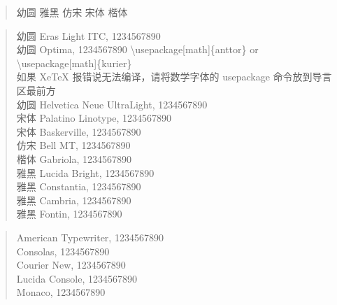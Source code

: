 \documentclass[12pt,a4paper]{article}
\begin{document}
\begin{Large}

\begin{verse}
{\YouYuan 幼圆}
{\YaHei 雅黑}
{\FangSong 仿宋}
{\SimSun 宋体}
{\KaiTi 楷体}
\end{verse}


\begin{verse}
{\YouYuan 幼圆} {\Eras Eras Light ITC, 1234567890}\\
{\YouYuan 幼圆} {\Optima Optima, 1234567890 \tiny{\Monaco \textbackslash{}usepackage[math]\{anttor\}
    or \textbackslash{}usepackage[math]\{kurier\}}}\\
    
    {\tiny\YouYuan 如果 {\Optima XeTeX{}} 报错说无法编译，请将数学字体的 {\Optima usepackage} 命令放到导言区最前方}\\
{\YouYuan 幼圆} {\HelveticaNeueUL Helvetica Neue UltraLight, 1234567890}\\
{\SimSun 宋体} {\Palatino Palatino Linotype, 1234567890}\\
{\SimSun 宋体} {\Baskerville Baskerville, 1234567890}\\
{\FangSong 仿宋} {\BellMT Bell MT, 1234567890}\\
{\KaiTi 楷体} {\Gabriola Gabriola, 1234567890}\\
{\YaHei 雅黑} {\LucidaBright Lucida Bright, 1234567890}\\
{\YaHei 雅黑} {\Constantia Constantia, 1234567890}\\
{\YaHei 雅黑} {\Cambria Cambria, 1234567890}\\
{\YaHei 雅黑} {\Fontin Fontin, 1234567890}\\
\end{verse}

\begin{verse}
{\Typewriter American Typewriter, 1234567890}\\
{\Consolas Consolas, 1234567890}\\
{\CourierNew Courier New, 1234567890}\\
{\LucidaConsole Lucida Console, 1234567890}\\
{\Monaco Monaco, 1234567890}\\
\end{verse}

\end{Large}
\end{document}
